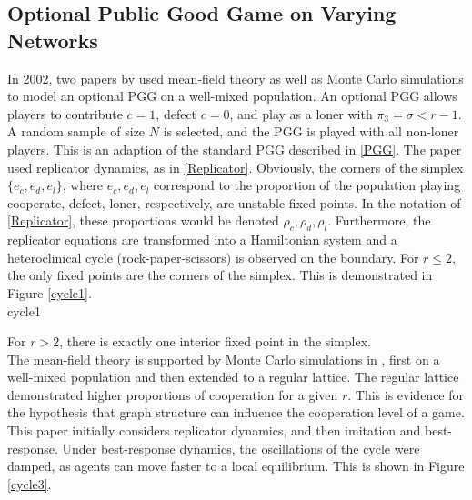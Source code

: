  \subsection{Optional Public Good Game on Varying Networks} 
 In 2002, two papers by \cite{RN47, RN67} used mean-field theory as well as Monte Carlo simulations to model an optional PGG on a well-mixed population. An optional PGG allows players to contribute $c=1$, defect $c=0$, and play as a loner with $\pi_{3} = \sigma<r-1$. A random sample of size $N$ is selected, and the PGG is played with all non-loner players. This is an adaption of the standard PGG described in \ref{PGG}. The paper \cite{RN47} used replicator dynamics, as in \ref{Replicator}. Obviously, the corners of the simplex $\{e_c, e_d, e_l\}$, where $e_c, e_d, e_l$ correspond to the proportion of the population playing cooperate, defect, loner, respectively,  are unstable fixed points. In the notation of \eqref{Replicator}, these proportions would be denoted $\rho_c,\rho_d,\rho_l$. Furthermore, the replicator equations are transformed into a Hamiltonian system and a heteroclinical cycle (rock-paper-scissors) is observed on the boundary. For $r\leq 2$, the only fixed points are the corners of the simplex. This is demonstrated in Figure \ref{cycle1}. \\
  {cycle1}
 
 
 For $r>2$, there is exactly one interior fixed point in the simplex. \\
 \FloatBarrier
 \FloatBarrier
 The mean-field theory is supported by Monte Carlo simulations in \cite{RN67}, first on a well-mixed population and then extended to a regular lattice. The regular lattice demonstrated higher proportions of cooperation for a given $r$. This is evidence for the hypothesis that graph structure can influence the cooperation level of a game. This paper initially considers replicator dynamics, and then imitation and best-response. Under best-response dynamics, the oscillations of the cycle were damped, as agents can move faster to a local equilibrium. This is shown in Figure \ref{cycle3}. \\
 
